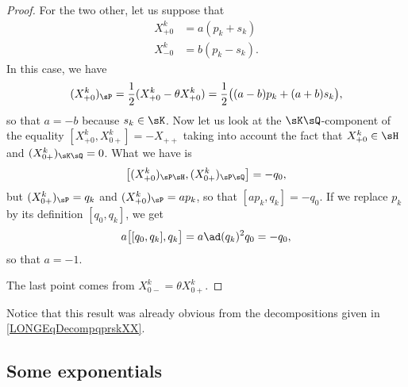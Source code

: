 \begin{proof}
	For the two other, let us suppose that
	\begin{subequations}
		\begin{align}
			X_{+0}^k&=a(p_k+s_k)\\
			X_{-0}^k&=b(p_k-s_k).
		\end{align}
	\end{subequations}
	In this case, we have
	\begin{equation}
			(X_{+0}^k)_{\sP}=\frac{ 1 }{2}(X_{+0}^k-\theta X_{+0}^k)
				=\frac{ 1 }{2}\big( (a-b)p_k+(a+b)s_k \big),
	\end{equation}
	so that $a=-b$ because $s_k\in \sK$. Now let us look at the $\sK\sQ$-component of the equality $[X_{+0}^k,X_{0+}^k]=-X_{++}$ taking into account the fact that $X_{+0}^k\in\sH$ and $(X_{0+}^k)_{\sK\sQ}=0$. What we have is 
    \begin{equation}
        \big[ (X_{+0}^k)_{\sP\sH},(X_{0+}^k)_{\sP\sQ} \big]=-q_0,
    \end{equation}
    but $(X_{0+}^k)_{\sP}=q_k$ and $(X_{+0}^k)_{\sP}=ap_k$, so that $[ap_k,q_k]=-q_0$. If we replace $p_k$ by its definition $[q_0,q_k]$, we get
	\begin{equation}
		a\big[ [q_0,q_k],q_k \big]=a\ad(q_k)^2q_0=-q_0,
	\end{equation}
	so that $a=-1$.

	The last point comes from $X_{0-}^k=\theta X_{0+}^k$.

\end{proof}
Notice that this result was already obvious from the decompositions given in \eqref{LONGEqDecompqprskXX}.


%
\subsection{Some exponentials}
%
\label{LONGSubSecSomeExpo}

